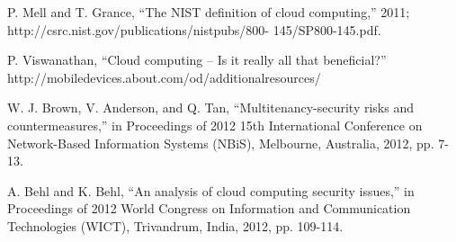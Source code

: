 \documentclass[a4paper]{article}
\begin{document}
\begin{thebibliography}{99}
	
 P. Mell and T. Grance, “The NIST definition of cloud computing,”  2011; http://csrc.nist.gov/publications/nistpubs/800-
	145/SP800-145.pdf.
	
 P. Viswanathan, “Cloud computing – Is it really all that beneficial?” http://mobiledevices.about.com/od/additionalresources/
 
 W. J. Brown, V. Anderson, and Q. Tan, “Multitenancy-security
risks and countermeasures,” in Proceedings of 2012 15th
International Conference on Network-Based Information
Systems (NBiS), Melbourne, Australia, 2012, pp. 7-13.

 A. Behl and K. Behl, “An analysis of cloud computing security issues,” in Proceedings of 2012 World Congress on Information and Communication Technologies (WICT), Trivandrum, India, 2012, pp. 109-114. 
 


\end{thebibliography}
\end{document}
